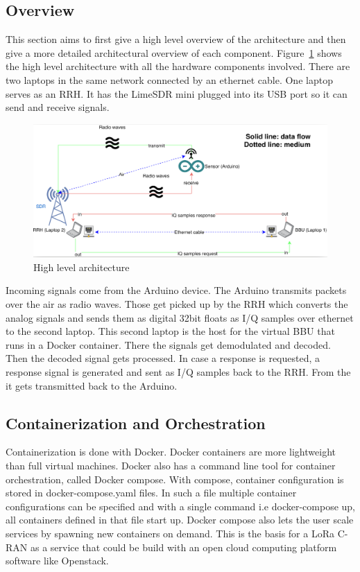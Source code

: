\subsection{Overview}
This section aims to first give a high level overview of the architecture and then give a more detailed 
architectural overview of each component.
Figure~\ref{fig:high_level_arch} shows the high level architecture with all the hardware components involved.
There are two laptops in the same network connected by an ethernet cable. One laptop serves as an RRH. It has the LimeSDR mini 
plugged into its USB port so it can send and receive signals.
\begin{figure}[h]
    \centering
    \includegraphics[width=1\textwidth]{figures/high_level_arch.png}
    \caption{High level architecture}
    \label{fig:high_level_arch}
\end{figure}
Incoming signals come from the Arduino device. The Arduino transmits packets over the air as radio waves. Those get picked up 
by the RRH which converts the analog signals and sends them as digital 32bit floats as I/Q samples over ethernet to the second laptop.
This second laptop is the host for the virtual BBU that runs in a Docker container. There the signals get demodulated and decoded.
Then the decoded signal gets processed. In case a response is requested, a response signal is generated and sent as I/Q samples back to the RRH.
From the it gets transmitted back to the Arduino.
\subsection{Containerization and Orchestration}
Containerization is done with Docker. Docker containers are more lightweight than full virtual machines.
Docker also has a command line tool for container orchestration, called Docker compose. With compose, container configuration is stored in docker-compose.yaml files.
In such a file multiple container configurations can be specified and with a single command i.e docker-compose up, all containers defined in that file start up.
Docker compose also lets the user scale services by spawning new containers on demand.
This is the basis for a LoRa C-RAN as a service that could be build with an open cloud computing platform software like Openstack.
